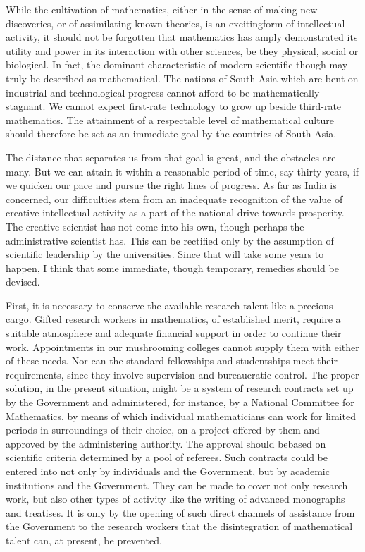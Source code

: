While the cultivation of mathematics, either in the sense of making new discoveries, or of assimilating known theories, is an exciting\pageoriginale form of intellectual activity, it should not be forgotten that mathematics has amply demonstrated its utility and power in its interaction with other sciences, be they physical, social or biological. In fact, the dominant characteristic of modern scientific though may truly be described as mathematical. The nations of South Asia which are bent on industrial and technological progress cannot afford to be mathematically stagnant. We cannot expect first-rate technology to grow up beside third-rate mathematics. The attainment of a respectable level of mathematical culture should therefore be set as an immediate goal by the countries of South Asia.

The distance that separates us from that goal is great, and the obstacles are many. But we can attain it within a reasonable period of time, say thirty years, if we quicken our pace and pursue the right lines of progress. As far as India is concerned, our difficulties stem from an inadequate recognition of the value of creative intellectual activity as a part of the national drive towards prosperity. The creative scientist has not come into his own, though perhaps the administrative scientist has. This can be rectified only by the assumption of scientific leadership by the universities. Since that will take some years to happen, I think that some immediate, though temporary, remedies should be devised.

First, it is necessary to conserve the available research talent like a precious cargo. Gifted research workers in mathematics, of established merit, require a suitable atmosphere and adequate financial support in order to continue their work. Appointments in our mushrooming colleges cannot supply them with either of these needs. Nor can the standard fellowships and studentships meet their requirements, since they involve supervision and bureaucratic control. The proper solution, in the present situation, might be a system of research contracts set up by the Government and administered, for instance, by a National Committee for Mathematics, by means of which individual mathematicians can work for limited periods in surroundings of their choice, on a project offered by them and approved by the administering authority. The approval should be\pageoriginale based on scientific criteria determined by a pool of referees. Such contracts could be entered into not only by individuals and the Government, but by academic institutions and the Government. They can be made to cover not only research work, but also other types of activity like the writing of advanced monographs and treatises. It is only by the opening of such direct channels of assistance from the Government to the research workers that the disintegration of mathematical talent can, at present, be prevented.

